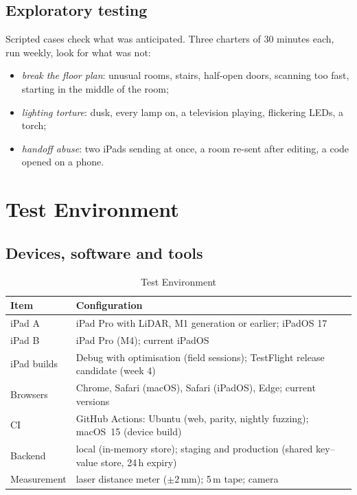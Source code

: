 \documentclass[conference,a4paper,10pt]{IEEEtran}
\begin{document}
\subsection{Exploratory testing}

Scripted cases check what was anticipated. Three charters of 30 minutes each,
run weekly, look for what was not:
\begin{itemize}
\item \emph{break the floor plan}: unusual rooms, stairs, half-open doors,
  scanning too fast, starting in the middle of the room;
\item \emph{lighting torture}: dusk, every lamp on, a television playing,
  flickering LEDs, a torch;
\item \emph{handoff abuse}: two iPads sending at once, a room re-sent after
  editing, a code opened on a phone.
\end{itemize}

\section{Test Environment}\label{sec:env}

\subsection{Devices, software and tools}

\begin{table}[!t]
\caption{Test Environment}
\label{tab:env}
\centering
\footnotesize
\begin{tabularx}{\columnwidth}{@{}L{1.9cm}Y@{}}
\toprule
Item & Configuration \\
\midrule
iPad A & iPad Pro with LiDAR, M1 generation or earlier; iPadOS 17 \\
iPad B & iPad Pro (M4); current iPadOS \\
iPad builds & Debug with optimisation (field sessions); TestFlight release candidate (week 4) \\
Browsers & Chrome, Safari (macOS), Safari (iPadOS), Edge; current versions \\
CI & GitHub Actions: Ubuntu (web, parity, nightly fuzzing); macOS~15 (device build) \\
Backend & local (in-memory store); staging and production (shared key--value store, 24\,h expiry) \\
Measurement & laser distance meter ($\pm$2\,mm); 5\,m tape; camera \\
\bottomrule
\end{tabularx}
\end{table}
\end{document}
